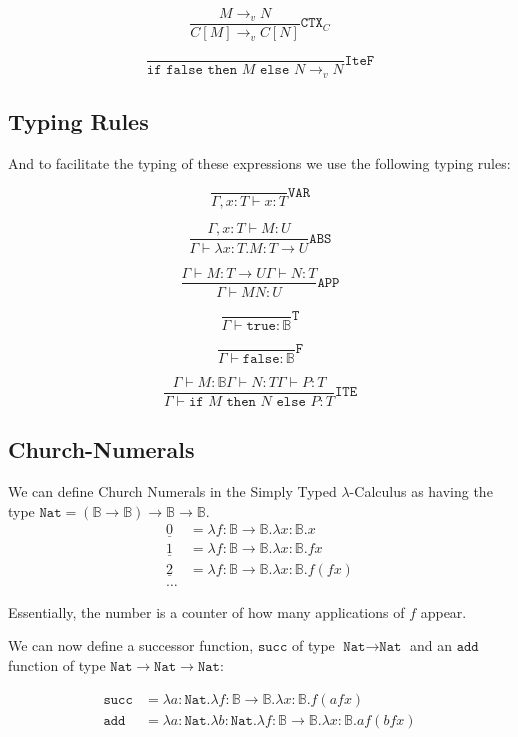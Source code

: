 \documentclass{article}
\newcommand{\B}{\mathbb{B}}
\newcommand{\Nat}{\texttt{Nat}}
\newcommand{\rarr}{\rightarrow}
\begin{document}
$$
\frac{M \rarr_v N}{C[M] \rarr_v C[N]} \texttt{CTX}_C
$$

$$
\frac{}{\texttt{if false}  \texttt{ then } M  \texttt{ else } N\rarr_v N} \texttt{IteF}
$$
\subsection{Typing Rules}
And to facilitate the typing of these expressions we use the following typing rules:

$$
\frac{}{\Gamma,x : T \vdash x : T}  \texttt{VAR}
$$

$$
\frac{\Gamma, x : T \vdash M:U}{\Gamma \vdash \lambda x:T.M : T \rarr U} \texttt{ABS}
$$

$$
\frac{\Gamma \vdash M : T \rarr U \Gamma \vdash N :T}{\Gamma \vdash M N : U} \texttt{APP}
$$

$$
\frac{}{\Gamma \vdash \texttt{true} : \mathbb{B}} \texttt{T}
$$

$$
\frac{}{\Gamma \vdash \texttt{false} : \mathbb{B} } \texttt{F}
$$

$$
\frac{\Gamma \vdash M : \mathbb{B} \Gamma \vdash N :T \Gamma \vdash P :T}{\Gamma \vdash \texttt{if } M \texttt{ then } N \texttt{ else } P:T  } \texttt{ITE}
$$

\subsection{Church-Numerals}

We can define Church Numerals in the Simply Typed $\lambda$-Calculus as having the type $ \texttt{Nat} = (\B \rarr \B) \rarr \B \rarr \B $.
\begin{align*}
    \underline{0} &= \lambda f:\B \rarr\B. \lambda x: \B.x \\
    \underline{1} &= \lambda f: \B \rarr \B. \lambda x: \B. f x \\
    \underline{2} &= \lambda f: \B \rarr \B. \lambda x: \B. f (f x) \\
    \dots
\end{align*}

Essentially, the number is a counter of how many applications of $f$ appear.

We can now define a successor function, $ \texttt{succ}$ of type $ \texttt{Nat} \rarr \texttt{Nat}$ and an $ \texttt{add}$ function of type $ \Nat \rarr \Nat \rarr \Nat$:

\begin{align*}
    \texttt{succ} &= \lambda a : \Nat . \lambda f: \B \rarr \B. \lambda  x: \B. f( a f x) \\
    \texttt{add} &= \lambda a: \Nat. \lambda b: \Nat. \lambda f: \B \rarr \B . \lambda x: \B. a f (b f x)
\end{align*}
\end{document}

